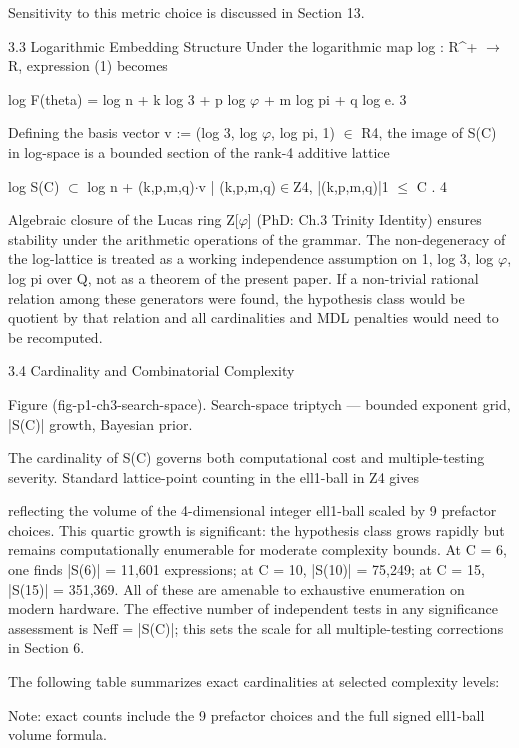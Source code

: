   Sensitivity to this metric choice is discussed in Section 13.

  3.3 Logarithmic Embedding Structure
  Under the logarithmic map log : R^+ $\rightarrow$ R, expression (1) becomes

  log F(theta) = log n + k log 3 + p log $\varphi$ + m log pi + q log e. 3

  Defining the basis vector v := (log 3, log $\varphi$, log pi, 1) $\in$ R4, the image of S(C) in
  log-space is a bounded section of the rank-4 additive lattice

  log S(C) $\subset$ { log n + (k,p,m,q)$\cdot$v | (k,p,m,q)$\in$Z4, |(k,p,m,q)|1 $\leq$ C }. 4

  Algebraic closure of the Lucas ring Z[$\varphi$] (PhD: Ch.3 Trinity Identity) ensures stability
  under the arithmetic operations of the grammar. The non-degeneracy of the log-lattice
  is treated as a working independence assumption on {1, log 3, log $\varphi$, log pi} over Q, not
  as a theorem of the present paper. If a non-trivial rational relation among these
  generators were found, the hypothesis class would be quotient by that relation and all
  cardinalities and MDL penalties would need to be recomputed.

  3.4 Cardinality and Combinatorial Complexity

  Figure (fig-p1-ch3-search-space). Search-space triptych --- bounded exponent grid, |S(C)| growth,
                                          Bayesian prior.

  The cardinality of S(C) governs both computational cost and multiple-testing severity.
  Standard lattice-point counting in the ell1-ball in Z4 gives

  reflecting the volume of the 4-dimensional integer ell1-ball scaled by 9 prefactor
  choices. This quartic growth is significant: the hypothesis class grows rapidly but
  remains computationally enumerable for moderate complexity bounds. At C = 6, one
  finds |S(6)| = 11{,}601 expressions; at C = 10, |S(10)| = 75{,}249; at C = 15, |S(15)| =
  351{,}369. All of these are amenable to exhaustive enumeration on modern hardware.
  The effective number of independent tests in any significance assessment is Neff =
  |S(C)|; this sets the scale for all multiple-testing corrections in Section 6.

  The following table summarizes exact cardinalities at selected complexity levels:

  Note: exact counts include the 9 prefactor choices and the full signed ell1-ball volume
  formula.

